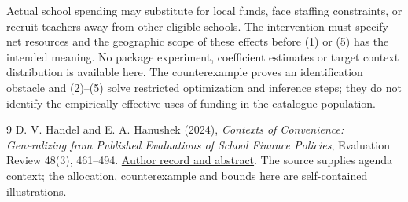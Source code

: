 \documentclass[11pt,a4paper]{article}
\begin{document}
Actual school spending may substitute for local funds, face staffing constraints, or recruit teachers away from other eligible schools. The intervention must specify net resources and the geographic scope of these effects before (1) or (5) has the intended meaning. No package experiment, coefficient estimates or target context distribution is available here. The counterexample proves an identification obstacle and (2)--(5) solve restricted optimization and inference steps; they do not identify the empirically effective uses of funding in the catalogue population.

\begin{thebibliography}{9}
 D. V. Handel and E. A. Hanushek (2024), \emph{Contexts of Convenience: Generalizing from Published Evaluations of School Finance Policies}, Evaluation Review 48(3), 461--494. \href{https://www.hanushek.net/publications/contexts-convenience-generalizing-published-evaluations-school-finance-policies-1}{Author record and abstract}. The source supplies agenda context; the allocation, counterexample and bounds here are self-contained illustrations.
\end{thebibliography}
\end{document}
